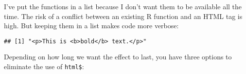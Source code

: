 \begin{Shaded}
\begin{Highlighting}[]
\StringTok{ }
    \NormalTok{(}\NormalTok{, }\NormalTok{)}
\NormalTok{  \}}
\NormalTok{\}}
\StringTok{ }\NormalTok{(}\NormalTok{, }\NormalTok{, }\NormalTok{)}
\StringTok{ }\NormalTok{(}
\end{Highlighting}
\end{Shaded}

I've put the functions in a list because I don't want them to be
available all the time. The risk of a conflict between an existing R
function and an HTML tag is high. But keeping them in a list makes code
more verbose:

\begin{Shaded}
\begin{Highlighting}[]
\OperatorTok{$}\NormalTok{(}\OperatorTok{$}\NormalTok{(}\NormalTok{), }\NormalTok{)}
\end{Highlighting}
\end{Shaded}

\begin{verbatim}
## [1] "<p>This is <b>bold</b> text.</p>"
\end{verbatim}

Depending on how long we want the effect to last, you have three options
to eliminate the use of \texttt{html\$}:

